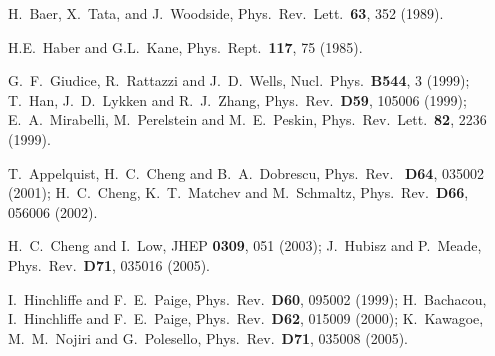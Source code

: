 \documentclass[prd,aps,floats,preprintnumbers,preprint,superscriptaddress,floatfix,nofootinbib]{revtex4}
\begin{document}
\begin{thebibliography}{99}
H.~Baer, X.~Tata, and J.~Woodside, Phys.~Rev.~Lett.~{\bf 63}, 352 (1989).

 H.E.~Haber and G.L.~Kane, Phys.~Rept.~{\bf 117}, 75 (1985).

  G.~F.~Giudice, R.~Rattazzi and J.~D.~Wells,
  Nucl.\ Phys.\  {\bf B544}, 3 (1999); 
  T.~Han, J.~D.~Lykken and R.~J.~Zhang,
  Phys.\ Rev.~{\bf D59}, 105006 (1999); 
 E.~A.~Mirabelli, M.~Perelstein and M.~E.~Peskin,
  Phys.\ Rev.\ Lett.\  {\bf 82}, 2236 (1999).

  T.~Appelquist, H.~C.~Cheng and B.~A.~Dobrescu,
  Phys.\ Rev.~ {\bf D64}, 035002 (2001);
  H.~C.~Cheng, K.~T.~Matchev and M.~Schmaltz,
  Phys.\ Rev.\ {\bf D66}, 056006 (2002).
 
  H.~C.~Cheng and I.~Low,
  JHEP {\bf 0309}, 051 (2003); 
  J.~Hubisz and P.~Meade,
  Phys.\ Rev.\  {\bf D71}, 035016 (2005).  

I.~Hinchliffe and F.~E.~Paige,
  Phys.\ Rev.\  {\bf D60}, 095002 (1999);
H.~Bachacou, I.~Hinchliffe and F.~E.~Paige,
  Phys.\ Rev.\  {\bf D62}, 015009 (2000); 
 K.~Kawagoe, M.~M.~Nojiri and G.~Polesello,
  Phys.\ Rev.\  {\bf D71}, 035008 (2005). 
 
\end{thebibliography}
\end{document}
